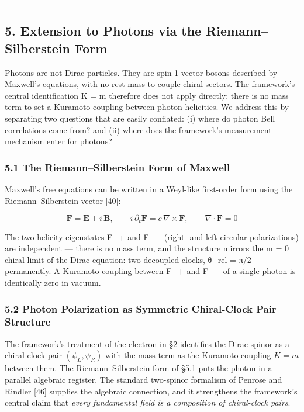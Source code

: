 \documentclass[
]{article}
\begin{document}
\begin{center}\rule{0.5\linewidth}{0.5pt}\end{center}

\subsection{5. Extension to Photons via the Riemann--Silberstein
Form}\label{extension-to-photons-via-the-riemannsilberstein-form}

Photons are not Dirac particles. They are spin-1 vector bosons described
by Maxwell's equations, with no rest mass to couple chiral sectors. The
framework's central identification K = m therefore does not apply
directly: there is no mass term to set a Kuramoto coupling between
photon helicities. We address this by separating two questions that are
easily conflated: (i) where do photon Bell correlations come from? and
(ii) where does the framework's measurement mechanism enter for photons?

\subsubsection{5.1 The Riemann--Silberstein Form of
Maxwell}\label{the-riemannsilberstein-form-of-maxwell}

Maxwell's free equations can be written in a Weyl-like first-order form
using the Riemann--Silberstein vector {[}40{]}:

\[\mathbf{F} = \mathbf{E} + i\,\mathbf{B}, \qquad i\,\partial_t \mathbf{F} = c\,\nabla \times \mathbf{F}, \qquad \nabla \cdot \mathbf{F} = 0\]

The two helicity eigenstates F\_+ and F\_− (right- and left-circular
polarizations) are independent --- there is no mass term, and the
structure mirrors the m = 0 chiral limit of the Dirac equation: two
decoupled clocks, θ\_rel = π/2 permanently. A Kuramoto coupling between
F\_+ and F\_− of a single photon is identically zero in vacuum.

\subsubsection{5.2 Photon Polarization as Symmetric Chiral-Clock Pair
Structure}\label{photon-polarization-as-symmetric-chiral-clock-pair-structure}

The framework's treatment of the electron in §2 identifies the Dirac
spinor as a chiral clock pair \((\psi_L, \psi_R)\) with the mass term as
the Kuramoto coupling \(K = m\) between them. The Riemann--Silberstein
form of §5.1 puts the photon in a parallel algebraic register. The
standard two-spinor formalism of Penrose and Rindler {[}46{]} supplies
the algebraic connection, and it strengthens the framework's central
claim that \emph{every fundamental field is a composition of
chiral-clock pairs}.
\end{document}
